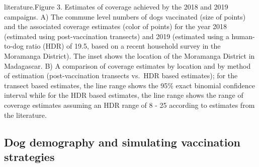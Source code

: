 \documentclass[tropicalmed,article,submit,moreauthors,pdftex]{mdpi}
\begin{document}
{{{{literature.}}{Figure 3. Estimates of coverage achieved by the 2018 and 2019 campaigns. A) The commune level numbers of dogs vaccinated (size of points) and the associated coverage estimates (color of points) for the year 2018 (estimated using post-vaccination transects) and 2019 (estimated using a human-to-dog ratio (HDR) of 19.5, based on a recent household survey in the Moramanga District). The inset shows the location of the Moramanga District in Madagascar. B) A comparison of coverage estimates by location and by method of estimation (post-vaccination transects vs.~HDR based estimates); for the transect based estimates, the line range shows the 95\% exact binomial confidence interval while for the HDR based estimates, the line range shows the range of coverage estimates assuming an HDR range of 8 - 25 according to estimates from the literature.}}\label{figure-3.-estimates-of-coverage-achieved-by-the-2018-and-2019-campaigns.-a-the-commune-level-numbers-of-dogs-vaccinated-size-of-points-and-the-associated-coverage-estimates-color-of-points-for-the-year-2018-estimated-using-post-vaccination-transects-and-2019-estimated-using-a-human-to-dog-ratio-hdr-of-19.5-based-on-a-recent-household-survey-in-the-moramanga-district.-the-inset-shows-the-location-of-the-moramanga-district-in-madagascar.-b-a-comparison-of-coverage-estimates-by-location-and-by-method-of-estimation-post-vaccination-transects-vs.-hdr-based-estimates-for-the-transect-based-estimates-the-line-range-shows-the-95-exact-binomial-confidence-interval-while-for-the-hdr-based-estimates-the-line-range-shows-the-range-of-coverage-estimates-assuming-an-hdr-range-of-8---25-according-to-estimates-from-the-literature.}}

\hypertarget{dog-demography-and-simulating-vaccination-strategies}{%
\subsection{Dog demography and simulating vaccination
strategies}\label{dog-demography-and-simulating-vaccination-strategies}}
\end{document}
